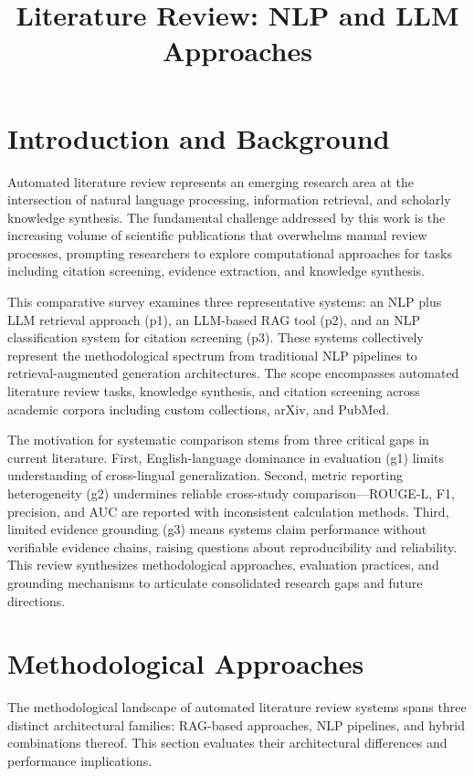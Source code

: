\documentclass{article}
\title{Literature Review: NLP and LLM Approaches}
\begin{document}
\maketitle
\section{Introduction and Background}
Automated literature review represents an emerging research area at the intersection of natural language processing, information retrieval, and scholarly knowledge synthesis. The fundamental challenge addressed by this work is the increasing volume of scientific publications that overwhelms manual review processes, prompting researchers to explore computational approaches for tasks including citation screening, evidence extraction, and knowledge synthesis.

This comparative survey examines three representative systems: an NLP plus LLM retrieval approach (p1), an LLM-based RAG tool (p2), and an NLP classification system for citation screening (p3). These systems collectively represent the methodological spectrum from traditional NLP pipelines to retrieval-augmented generation architectures. The scope encompasses automated literature review tasks, knowledge synthesis, and citation screening across academic corpora including custom collections, arXiv, and PubMed.

The motivation for systematic comparison stems from three critical gaps in current literature. First, English-language dominance in evaluation (g1) limits understanding of cross-lingual generalization. Second, metric reporting heterogeneity (g2) undermines reliable cross-study comparison—ROUGE-L, F1, precision, and AUC are reported with inconsistent calculation methods. Third, limited evidence grounding (g3) means systems claim performance without verifiable evidence chains, raising questions about reproducibility and reliability. This review synthesizes methodological approaches, evaluation practices, and grounding mechanisms to articulate consolidated research gaps and future directions.

\section{Methodological Approaches}
The methodological landscape of automated literature review systems spans three distinct architectural families: RAG-based approaches, NLP pipelines, and hybrid combinations thereof. This section evaluates their architectural differences and performance implications.
\end{document}
